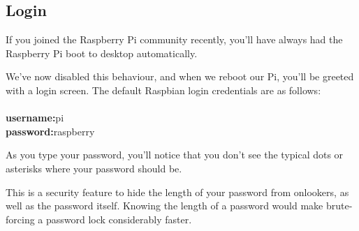 	\subsection{Login}
	
		If you joined the Raspberry Pi community recently, you'll have always had the Raspberry Pi boot to desktop automatically.
		
		We've now disabled this behaviour, and when we reboot our Pi, you'll be greeted with a login screen. The default Raspbian login credentials are as follows:
		\\
		\\\textbf{username:}\hspace{2cm}pi
		\\\textbf{password:}\hspace{2cm}raspberry
		
		\begin{aside}
		As you type your password, you'll notice that you don't see the typical dots or asterisks where your password should be.
		
		This is a security feature to hide the length of your password from onlookers, as well as the password itself. Knowing the length of a password would make brute-forcing a password lock considerably faster.
		\end{aside}